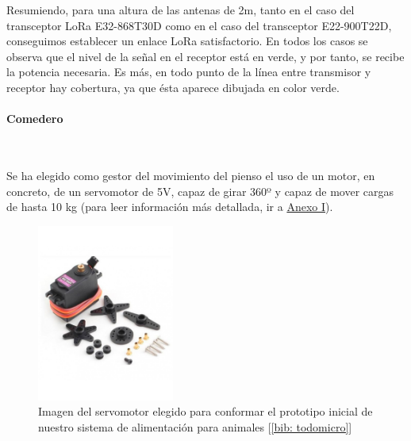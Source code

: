 \documentclass[12pt]{article}
\newcommand{\subsubsubsection}[1]{\paragraph{#1}\mbox{}\\}
\begin{document}
	\noindent Resumiendo, para una altura de las antenas de 2m, tanto en el caso del transceptor LoRa E32-868T30D como en el caso del transceptor E22-900T22D, conseguimos establecer un enlace LoRa satisfactorio. En todos los casos se observa que el nivel de la señal en el receptor está en verde, y por tanto, se recibe la potencia necesaria. Es más, en todo punto de la línea entre transmisor y receptor hay cobertura, ya que ésta aparece dibujada en color verde.
	
	\pagebreak
	
	
	
	\subsubsubsection{Comedero}
	\label{subsubsubsection: comedero eleccion}
	
	 \noindent Se ha elegido como gestor del movimiento del pienso el uso de un motor, en concreto, de un servomotor de 5V, capaz de girar 360º y capaz de mover cargas de hasta 10 kg (para leer información más detallada, ir a \hyperref[anexo I: ficha tecnica]{Anexo I}). \\
	
		\begin{figure}[h]
		\begin{center}
			\includegraphics[width=0.4\textwidth]{img/servo_mg996r.jpg}
			\caption{Imagen del servomotor elegido para conformar el prototipo inicial de nuestro sistema de alimentación para animales [\ref{bib: todomicro}]}
			\label{Imagen servomotor MG996R}
		\end{center}
	\end{figure}
	
\end{document}
